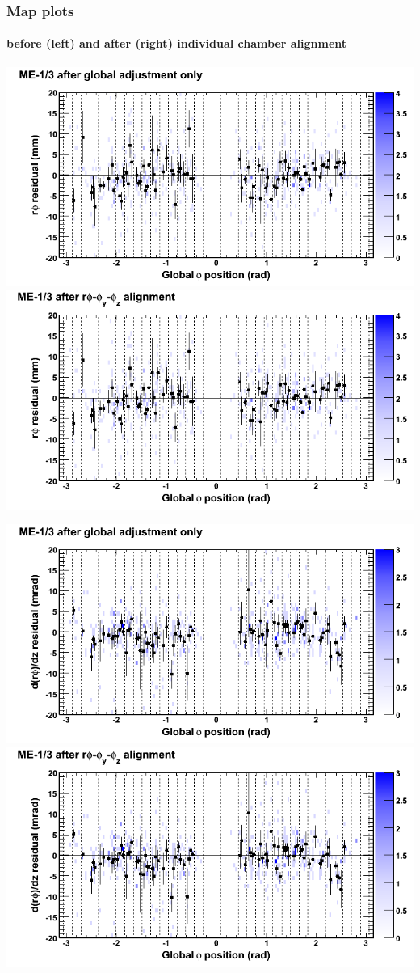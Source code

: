 \documentclass[compress]{beamer}
\begin{document}
\begin{frame}
\frametitle{Map plots}
\framesubtitle{before (left) and after (right) individual chamber alignment}
\includegraphics[width=0.5\linewidth]{ringmapplots_3dof/before_CSCvsphi_mem13_x.png} \includegraphics[width=0.5\linewidth]{ringmapplots_3dof/after_CSCvsphi_mem13_x.png}

\includegraphics[width=0.5\linewidth]{ringmapplots_3dof/before_CSCvsphi_mem13_dxdz.png} \includegraphics[width=0.5\linewidth]{ringmapplots_3dof/after_CSCvsphi_mem13_dxdz.png}
\end{frame}
\end{document}
